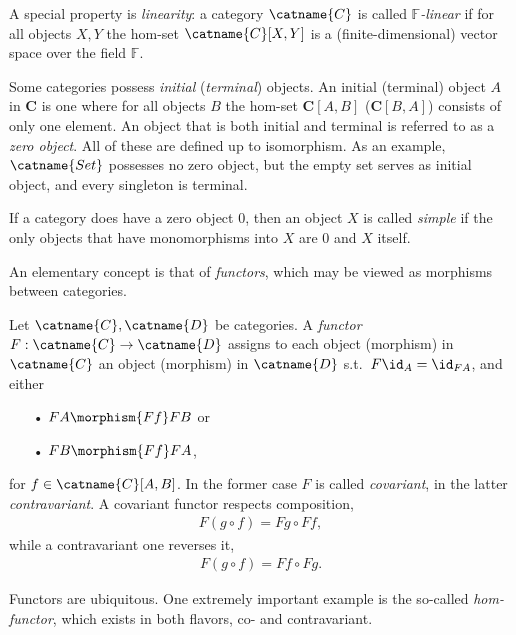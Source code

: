 A special property is \emph{linearity}: a category $\catname{C}$ is called \emph{$\mathbb{F}$-linear} if for all objects $X,Y$ the hom-set $\catname{C}[X,Y]$ is a (finite-dimensional) vector space over the field $\mathbb{F}$.

Some categories possess \emph{initial} (\emph{terminal}) objects. An initial (terminal) object $A$ in $\mathbf{C}$ is one where for all objects $B$ the hom-set $\mathbf{C}[A,B]$ ($\mathbf{C}[B,A]$) consists of only one element. An object that is both initial and terminal is referred to as a \emph{zero object}. All of these are defined up to isomorphism. As an example, $\catname{Set}$ possesses no zero object, but the empty set serves as initial object, and every singleton is terminal.

If a category does have a zero object $0$, then an object $X$ is called \emph{simple} if the only objects that have monomorphisms into $X$ are $0$ and $X$ itself.

\bigno

\bigno
An elementary concept is that of \emph{functors}, which may be viewed as morphisms between categories.

\begin{definition}[Functor]{}
Let $\catname{C},\catname{D}$ be categories. A \emph{functor} $F:\catname{C}\rightarrow \catname{D}$ assigns to each object (morphism) in $\catname{C}$ an object (morphism) in $\catname{D}$ s.t.\ $F\id_A = \id_{FA}$, and either
\begin{itemize}
\item[•]$FA\morphism{Ff} FB$ or
\item[•]$FB\morphism{Ff} FA$,
\end{itemize}
 for $f\in\catname{C}[A,B]$.
In the former case $F$ is called \emph{covariant}, in the latter \emph{contravariant}. A covariant functor respects composition,
\begin{align*}
F(g\circ f) = Fg\circ Ff,
\end{align*}
while a contravariant one reverses it,
\begin{align*}
F(g\circ f) = Ff\circ Fg.
\end{align*}
\end{definition}
Functors are ubiquitous. One extremely important example is the so-called \emph{hom-functor}, which exists in both flavors, co- and contravariant.

